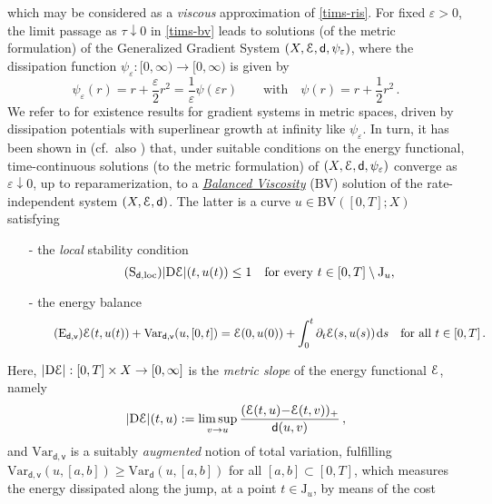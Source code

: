 \documentclass[a4paper,10pt,reqno]{amsart} %
\numberwithin{equation}{section}
\newcommand{\down}{\downarrow}
\def\rmD{{\mathrm D}} \def\rmE{{\mathrm E}} \def\rmF{{\mathrm F}}
\def\dd{\;\!\mathrm{d}} %
\newcommand{\eps}{\varepsilon}
\newcommand{\Xs}{X}
\newcommand{\BV}{\mathrm{BV}}
\newcommand{\mdn}{\mathsf{d}}
\newcommand{\md}[2]{\mathsf{d}(#1,#2)}
\newcommand{\ene}[2]{\mathcal{E}(#1,#2)}
\newcommand{\Vari}[4]{\mathrm{Var}_{#1}(#2,[#3,#4])}
\newcommand{\Varname}[1]{\mathrm{Var}_{#1}}
\newcommand{\jump}[1]{\mathrm{J}_{#1}}
\newcommand{\bvcostname}{\mathsf{v}}
\newcommand{\RIS}{(\Xs,\calE,\mdn)}
\newcommand{\slope}[3]{|\rmD {#1}|(#2,#3)}
\begin{document}
which may be considered as  a \emph{viscous} approximation of 
\eqref{tims-ris}.
For fixed $\eps>0$, the limit passage as $\tau\down 0$ in   \eqref{tims-bv} leads to solutions (of the metric formulation) of the
 Generalized Gradient System $(\Xs,\calE,\mdn,\psi_\eps)$, where the dissipation function $\psi_\eps: [0,\infty)\to[0,\infty)$ is   given by
\begin{equation}
\label{psi-eps-intro}
\psi_\eps(r) =r+\frac{\eps}2 r^2= \frac1{\eps} \psi(\eps r) \qquad \text{with}  \quad \psi(r) = r +\frac12 r^2\,.
\end{equation}
 We refer to \cite{RMS08} for existence results for gradient systems in metric spaces, driven by dissipation potentials with superlinear  growth at infinity like $\psi_\eps$.   
     In turn, it has been shown in \cite{MRS09}  (cf.\ also \cite{MRS-MJM})
     that, under suitable conditions on the energy functional, time-continuous solutions (to the metric formulation)  of  $(\Xs,\calE,\mdn,\psi_\eps)$  converge as $\eps \down 0$,  up to reparamerization, to a \underline{\emph{Balanced Viscosity}} ($\BV$)   solution of the rate-independent system
     $\RIS$. The latter is  a curve $u\in \BV([0,T];\Xs)$
     satisfying 
      \begin{itemize}
\item[-] the \emph{local} stability condition
\begin{equation}
\label{loc-stab-INTRO}
\tag{$\mathrm{S}_{\mdn,\mathrm{loc}}$}
\slope \calE t{u(t)} \leq 1 \quad \text{for every } t \in [0,T]\setminus \jump u,
\end{equation}
\item[-]  the energy balance
\begin{equation}
\label{BV-enbal-INTRO}
\tag{$\mathrm{E}_{\mdn,\bvcostname}$}
\ene t{u(t)} + \Vari {\mdn,\bvcostname}{u}0{t} = \ene 0{u(0)} +\int_0^t  \partial_t \ene{s}{u(s)}   \dd s \quad \text{for all } t \in [0,T]\,.
\end{equation}
\end{itemize}
Here, $|\rmD \calE|: [0,T]\times \Xs \to [0,\infty]$ is the  \emph{metric slope} of the energy functional ${\mathcal E}$, namely
\begin{equation}
\label{slope-INTRO}
\slope \calE tu:  = \limsup_{v\to u} \frac{(\ene tu{-}\ene tv)_+}{\md uv}\,,
\end{equation}
and $\Varname {\mdn,\bvcostname} $ is a suitably \emph{augmented} notion of total variation, fulfilling $\Vari {\mdn,\bvcostname}{u}a{b} \geq 
 \Vari {\mdn}{u}a{b} $ for all  $[a,b]\subset [0,T]$, which measures the energy dissipated along  the jump, at a point  $t\in \jump u$, by means of the cost
\end{document}
